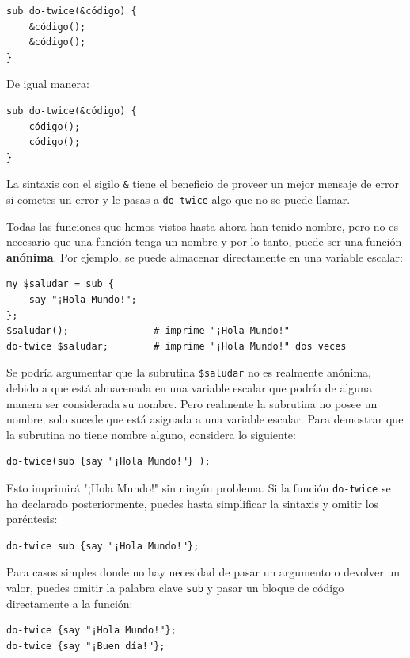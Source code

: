 \begin{verbatim}
sub do-twice(&código) {
    &código(); 
    &código();
}
\end{verbatim}

De igual manera:
\begin{verbatim}
sub do-twice(&código) {
    código(); 
    código();
}
\end{verbatim}

La sintaxis con el sigilo \verb|&| tiene el beneficio de
proveer un mejor mensaje de error si cometes un error y le pasas
a \verb|do-twice| algo que no se puede llamar. 

Todas las funciones que hemos vistos hasta ahora han tenido nombre,
pero no es necesario que una función tenga un nombre y por lo tanto,
puede ser una función {\bf anónima}. Por ejemplo, 
se puede almacenar directamente en una variable escalar:

\begin{verbatim}
my $saludar = sub {
    say "¡Hola Mundo!";
};
$saludar();               # imprime "¡Hola Mundo!"
do-twice $saludar;        # imprime "¡Hola Mundo!" dos veces
\end{verbatim}

Se podría argumentar que la subrutina \verb|$saludar| no es realmente
anónima, debido a que está almacenada en una variable escalar 
que podría de alguna manera ser considerada su nombre. Pero realmente
la subrutina no posee un nombre; solo sucede que está asignada a una
variable escalar. Para demostrar que la subrutina no tiene nombre 
alguno, considera lo siguiente:

\begin{verbatim}
do-twice(sub {say "¡Hola Mundo!"} );
\end{verbatim}

Esto imprimirá "¡Hola Mundo!" sin ningún problema. Si la función
\verb|do-twice| se ha declarado posteriormente, puedes hasta 
simplificar la sintaxis y omitir los paréntesis:

\begin{verbatim}
do-twice sub {say "¡Hola Mundo!"};
\end{verbatim}

Para casos simples donde no hay necesidad de pasar un argumento
o devolver un valor, puedes omitir la palabra clave \verb|sub|
y pasar un bloque de código directamente a la función:

\begin{verbatim}
do-twice {say "¡Hola Mundo!"};
do-twice {say "¡Buen día!"};
\end{verbatim}

